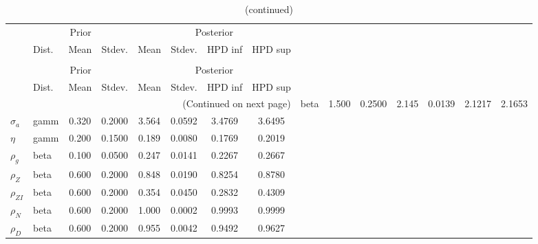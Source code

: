  
\begin{center}
\begin{longtable}{llcccccc} 
\caption{Results from Metropolis-Hastings (parameters)}
 \label{Table:MHPosterior:1}\\
\toprule 
  & \multicolumn{3}{c}{Prior}  &  \multicolumn{4}{c}{Posterior} \\
  \cmidrule(r{.75em}){2-4} \cmidrule(r{.75em}){5-8}
  & Dist. & Mean  & Stdev. & Mean & Stdev. & HPD inf & HPD sup\\
\midrule \endfirsthead 
\caption{(continued)}\\\toprule 
  & \multicolumn{3}{c}{Prior}  &  \multicolumn{4}{c}{Posterior} \\
  \cmidrule(r{.75em}){2-4} \cmidrule(r{.75em}){5-8}
  & Dist. & Mean  & Stdev. & Mean & Stdev. & HPD inf & HPD sup\\
\midrule \endhead 
\bottomrule \multicolumn{8}{r}{(Continued on next page)} \endfoot 
\bottomrule \endlastfoot 
${\gamma}$ & beta &   1.500 & 0.2500 &   2.145& 0.0139 &  2.1217 &  2.1653 \\ 
${\sigma_a}$ & gamm &   0.320 & 0.2000 &   3.564& 0.0592 &  3.4769 &  3.6495 \\ 
${\eta}$ & gamm &   0.200 & 0.1500 &   0.189& 0.0080 &  0.1769 &  0.2019 \\ 
${\rho_g}$ & beta &   0.100 & 0.0500 &   0.247& 0.0141 &  0.2267 &  0.2667 \\ 
${\rho_Z}$ & beta &   0.600 & 0.2000 &   0.848& 0.0190 &  0.8254 &  0.8780 \\ 
${\rho_{ZI}}$ & beta &   0.600 & 0.2000 &   0.354& 0.0450 &  0.2832 &  0.4309 \\ 
${\rho_N}$ & beta &   0.600 & 0.2000 &   1.000& 0.0002 &  0.9993 &  0.9999 \\ 
${\rho_D}$ & beta &   0.600 & 0.2000 &   0.955& 0.0042 &  0.9492 &  0.9627 \\ 
\end{longtable}
 \end{center}
